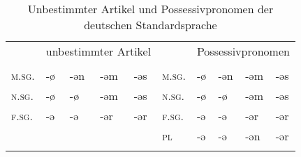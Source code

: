 \begin{table}[H]
	\caption{Unbestimmter Artikel und Possessivpronomen der deutschen Standardsprache \citep[169-177]{Eisenberg2006}}\label{table103}
	\begin{tabular}{llllllllll}
		\lsptoprule
		& \multicolumn{4}{c}{unbestimmter Artikel}  &  & \multicolumn{4}{c}{Possessivpronomen} \\\cmidrule(lr){2-5}\cmidrule(lr){7-10}
		& \NOM & \AKK & \DAT & \GEN &  & \NOM & \AKK & \DAT & \GEN\\\midrule
		\textsc{m.sg.} & {}-ø & {}-ən & {}-əm & {}-əs & \textsc{m.sg.} & {}-ø & {}-ən & {}-əm & {}-əs\\
		\textsc{n.sg.} & {}-ø & {}-ø & {}-əm & {}-əs & \textsc{n.sg.} & {}-ø & {}-ø & {}-əm & {}-əs\\
		\textsc{f.sg.} & {}-ə & {}-ə & {}-ər & {}-ər & \textsc{f.sg.} & {}-ə & {}-ə & {}-ər & {}-ər\\
		&  &  &  &  & \textsc{pl} & {}-ə & {}-ə & {}-ən & {}-ər\\
		\lspbottomrule
	\end{tabular}
\end{table}


